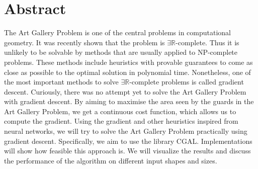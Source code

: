 \section*{Abstract}


The Art Gallery Problem is one of the central problems in computational geometry. It was recently shown that the problem is $\exists \mathbb{R}$-complete. Thus it is unlikely to be solvable by methods that are usually applied to NP-complete problems. These methods include heuristics with provable guarantees to come as close as possible to the optimal solution in polynomial time. Nonetheless, one of the most important methods to solve $\exists \mathbb{R}$-complete problems is called gradient descent. Curiously, there was no attempt yet to solve the Art Gallery Problem with gradient descent. By aiming to maximise the area seen by the guards in the Art Gallery Problem, we get a continuous cost function, which allows us to compute the gradient. Using the gradient and other heuristics inspired from neural networks, we will try to solve the Art Gallery Problem practically using gradient descent. Specifically, we aim to use the library CGAL. 
Implementations will show how feasible this approach is. We will visualize the results and discuss the performance of the algorithm on different input shapes and sizes.